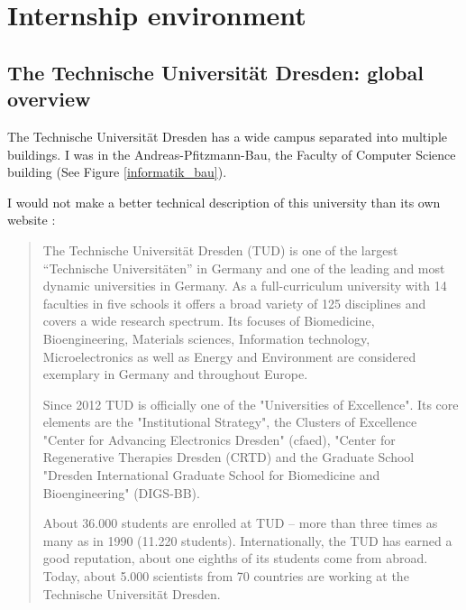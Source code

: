 \documentclass[a4paper,11pt]{report}
\begin{document}
\section{Internship environment}

\subsection{The Technische Universität Dresden: global overview}

The Technische Universität Dresden has a wide campus separated into multiple buildings. I was in the Andreas-Pfitzmann-Bau, the Faculty of Computer Science building (See Figure \ref{informatik_bau}).

I would not make a better technical description of this university than its own website \cite{tud:website}:

\blockquote{The Technische Universität Dresden (TUD) is one of the largest “Technische Universitäten” in Germany and one of the leading and most dynamic universities in Germany. As a full-curriculum university with 14 faculties in five schools it offers a broad variety of 125 disciplines and covers a wide research spectrum. Its focuses of Biomedicine, Bioengineering, Materials sciences, Information technology, Microelectronics as well as Energy and Environment are considered exemplary in Germany and throughout Europe.

Since 2012 TUD is officially one of the "Universities of Excellence". Its core elements are the "Institutional Strategy", the Clusters of Excellence "Center for Advancing Electronics Dresden" (cfaed), "Center for Regenerative Therapies Dresden (CRTD) and the Graduate School "Dresden International Graduate School for Biomedicine and Bioengineering" (DIGS-BB).

About 36.000 students are enrolled at TUD – more than three times as many as in 1990 (11.220 students). Internationally, the TUD has earned a good reputation, about one eighths of its students come from abroad. Today, about 5.000 scientists from 70 countries are working at the Technische Universität Dresden.}
\end{document}
